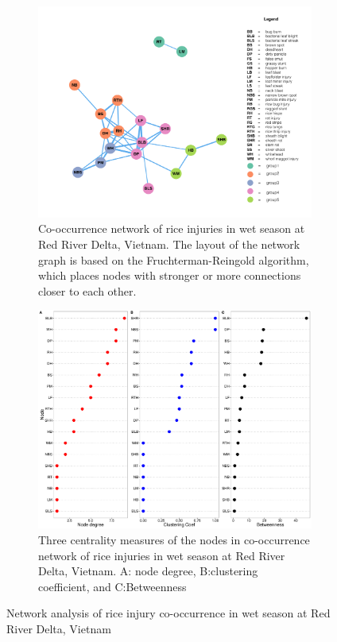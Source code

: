 \begin{figure}
    \centering
    \begin{subfigure}[b]{1\textwidth}
        \includegraphics[width = 1\textwidth]{figures/networkRR_ws/networkRR_ws.pdf}
        \caption{Co-occurrence network of rice injuries in wet season at Red River Delta, Vietnam. The layout of the network graph is based on the Fruchterman-Reingold algorithm, which places nodes with stronger or more connections closer to each other.}
        \label{fig:networkRR_ws}
    \end{subfigure}
    \begin{subfigure}[b]{1\textwidth}
        \includegraphics[width = 1\textwidth]{figures/nodepropRR_ws/nodepropRR_ws.pdf}
        \caption{Three centrality measures of the nodes in co-occurrence network of rice injuries in wet season at Red River Delta, Vietnam. A: node degree, B:clustering coefficient, and C:Betweenness}
        \label{fig:nodepropRR_ws}
    \end{subfigure}
    \caption{Network analysis of rice injury co-occurrence in wet season at Red River Delta, Vietnam}
    \label{fig:RR_ws}
\end{figure}


